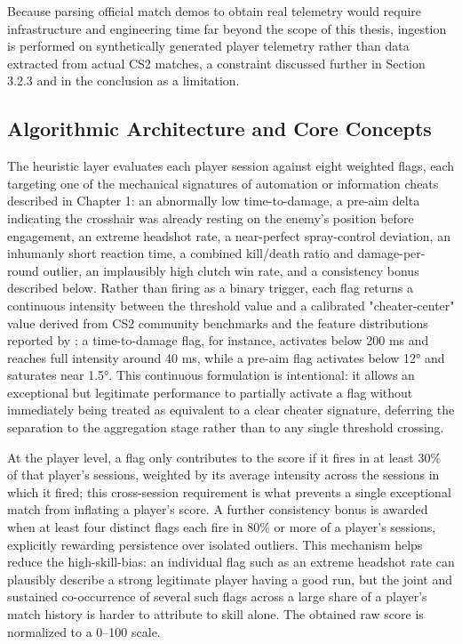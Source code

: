 Because parsing official match demos to obtain real telemetry would require infrastructure and engineering time far beyond the scope of this thesis, ingestion is performed on synthetically generated player telemetry rather than data extracted from actual CS2 matches, a constraint discussed further in Section 3.2.3 and in the conclusion as a limitation.

\subsection{Algorithmic Architecture and Core Concepts}
\label{sec:three:one:two}

The heuristic layer evaluates each player session against eight weighted flags, each targeting one of the mechanical signatures of automation or information cheats described in Chapter 1: an abnormally low time-to-damage, a pre-aim delta indicating the crosshair was already resting on the enemy's position before engagement, an extreme headshot rate, a near-perfect spray-control deviation, an inhumanly short reaction time, a combined kill/death ratio and damage-per-round outlier, an implausibly high clutch win rate, and a consistency bonus described below. Rather than firing as a binary trigger, each flag returns a continuous intensity between the threshold value and a calibrated "cheater-center" value derived from CS2 community benchmarks and the feature distributions reported by \citeauthor{Loo2025} \cite{Loo2025}; a time-to-damage flag, for instance, activates below 200 ms and reaches full intensity around 40 ms, while a pre-aim flag activates below 12° and saturates near 1.5°. This continuous formulation is intentional: it allows an exceptional but legitimate performance to partially activate a flag without immediately being treated as equivalent to a clear cheater signature, deferring the separation to the aggregation stage rather than to any single threshold crossing.

At the player level, a flag only contributes to the score if it fires in at least 30\% of that player's sessions, weighted by its average intensity across the sessions in which it fired; this cross-session requirement is what prevents a single exceptional match from inflating a player's score. A further consistency bonus is awarded when at least four distinct flags each fire in 80\% or more of a player's sessions, explicitly rewarding persistence over isolated outliers. This mechanism helps reduce the high-skill-bias: an individual flag such as an extreme headshot rate can plausibly describe a strong legitimate player having a good run, but the joint and sustained co-occurrence of several such flags across a large share of a player's match history is harder to attribute to skill alone. The obtained raw score is normalized to a 0–100 scale.

